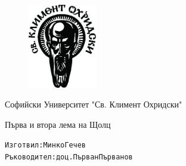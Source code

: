 \documentclass[12pt]{article}
\begin{document}
\begin{figure}[ht!]
\centering
\includegraphics[width=30mm]{su.jpg}
\label{overflow}
\end{figure}

\begin{center}
Софийски Университет "Св. Климент Охридски"
\end{center}

\begin{center}
\huge{Първа и втора лема на Щолц}
\end{center}

\null
\vfill
\begin{alltt}
Изготвил: Минко Гечев
Ръководител: доц. Първан Първанов
\end{alltt}

\newpage\mbox{}\newpage

\newtheorem{lemma1}{Лема}
\newtheorem*{lemma2}{Първа лема на Щолц}
\newtheorem*{lemma3}{Втора лема на Щолц}
\newtheorem{theorem}{Теорема}
\newtheorem{example}{Пример}
\end{document}
